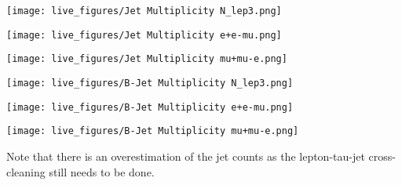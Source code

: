 
\begin{frame}
  \centering
  \begin{minipage}[c][0.48\textheight]{0.32\textwidth}
      \texttt{[image: live\_figures/Jet Multiplicity N\_lep3.png]}
  \end{minipage}
  \begin{minipage}[c][0.48\textheight]{0.32\textwidth}
    \texttt{[image: live\_figures/Jet Multiplicity e+e-mu.png]}
  \end{minipage}
  \begin{minipage}[c][0.48\textheight]{0.32\textwidth}
    \texttt{[image: live\_figures/Jet Multiplicity mu+mu-e.png]}
  \end{minipage}

  \begin{minipage}[c][0.48\textheight]{0.32\textwidth}
    \texttt{[image: live\_figures/B-Jet Multiplicity N\_lep3.png]}
  \end{minipage}
  \begin{minipage}[c][0.48\textheight]{0.32\textwidth}
    \texttt{[image: live\_figures/B-Jet Multiplicity e+e-mu.png]}
  \end{minipage}
  \begin{minipage}[c][0.48\textheight]{0.32\textwidth}
    \texttt{[image: live\_figures/B-Jet Multiplicity mu+mu-e.png]}
  \end{minipage}
  \footnotesize
  Note that there is an overestimation of the jet counts as the lepton-tau-jet cross-cleaning still needs to be done.
\end{frame}
